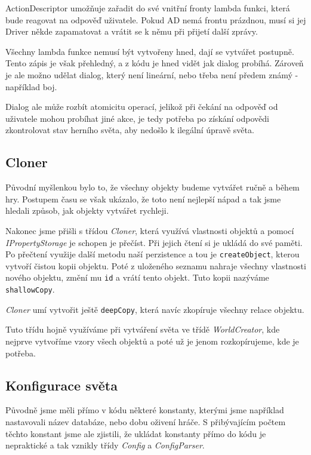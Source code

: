 \documentclass[11pt, a4paper]{article}
\def\class#1{\emph{#1}}
\begin{document}
\noindent ActionDescriptor umožňuje zařadit do své vnitřní fronty lambda funkci, která bude reagovat na odpověď uživatele. Pokud AD nemá frontu prázdnou, musí si jej Driver někde zapamatovat a vrátit se k němu při přijetí další zprávy.

Všechny lambda funkce nemusí být vytvořeny hned, dají se vytvářet postupně. Tento zápis je však přehledný, a z kódu je hned vidět jak dialog probíhá. Zároveň je ale možno udělat dialog, který není lineární, nebo třeba není předem známý - například boj.

Dialog ale může rozbít atomicitu operací, jelikož při čekání na odpověď od uživatele mohou probíhat jiné akce, je tedy potřeba po získání odpovědi zkontrolovat stav herního světa, aby nedošlo k ilegální úpravě světa.

\subsection{Cloner}

Původní myšlenkou bylo to, že všechny objekty budeme vytvářet ručně a během hry. Postupem času se však ukázalo, že toto není nejlepší nápad a tak jsme hledali způsob, jak objekty vytvářet rychleji.

Nakonec jsme přišli s třídou \class{Cloner}, která využívá vlastnosti objektů a pomocí \class{IPropertyStorage} je schopen je přečíst. Při jejich čtení si je ukládá do své paměti. Po přečtení využije další metodu naší perzistence a tou je \texttt{createObject}, kterou vytvoří čistou kopii objektu. Poté z uloženého seznamu nahraje všechny vlastnosti nového objektu, změní mu \texttt{id} a vrátí tento objekt. Tuto kopii nazýváme \texttt{shallowCopy}.

\class{Cloner} umí vytvořit ještě \texttt{deepCopy}, která navíc zkopíruje všechny relace objektu.

Tuto třídu hojně využíváme při vytváření světa ve třídě \class{WorldCreator}, kde nejprve vytvoříme vzory všech objektů a poté už je jenom rozkopírujeme, kde je potřeba.

\subsection{Konfigurace světa}

Původně jsme měli přímo v kódu některé konstanty, kterými jsme například nastavovali název databáze, nebo dobu oživení hráče. S přibývajícím počtem těchto konstant jsme ale zjistili, že ukládat konstanty přímo do kódu je nepraktické a tak vznikly třídy \class{Config} a \class{ConfigParser}. 
\end{document}

